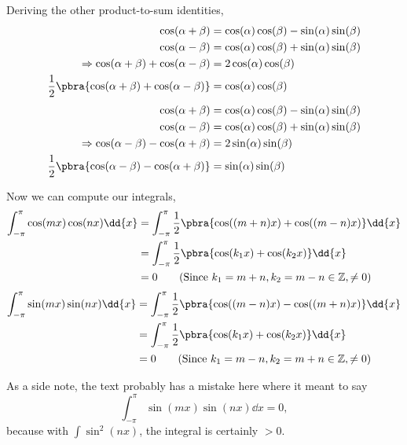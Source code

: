 {{Deriving the other product-to-sum identities,
\begin{align*}
  \cos(\alpha + \beta) &= \cos(\alpha)\cos(\beta) - \sin(\alpha)\sin(\beta)\\
  \cos(\alpha - \beta) &= \cos(\alpha)\cos(\beta) + \sin(\alpha)\sin(\beta)\\
  \Rightarrow \cos(\alpha + \beta) + 
  \cos(\alpha - \beta) &= 2\cos(\alpha)\cos(\beta)\\
  \frac{1}{2}\pbra{
    \cos(\alpha + \beta) + 
    \cos(\alpha - \beta) 
  }
  &= \cos(\alpha)\cos(\beta)
\end{align*}
\begin{align*}
  \cos(\alpha + \beta) &= \cos(\alpha)\cos(\beta) - \sin(\alpha)\sin(\beta)\\
  \cos(\alpha - \beta) &= \cos(\alpha)\cos(\beta) + \sin(\alpha)\sin(\beta)\\
  \Rightarrow \cos(\alpha - \beta) -
  \cos(\alpha + \beta) &= 2\sin(\alpha)\sin(\beta)\\
  \frac{1}{2}\pbra{
    \cos(\alpha - \beta) - 
    \cos(\alpha + \beta) 
  }
  &= \sin(\alpha)\sin(\beta)
\end{align*}

Now we can compute our integrals,
\begin{align*}
  \int_{-\pi}^\pi \cos(mx)\cos(nx)\dd{x} 
  &=
  \int_{-\pi}^\pi \frac{1}{2}\pbra{
    \cos((m+n)x)  + \cos((m-n)x)
  } \dd{x}\\
  &=
  \int_{-\pi}^\pi \frac{1}{2}\pbra{
    \cos(k_1x)  + \cos(k_2x)
  } \dd{x}\\
  &= 0 
  \tag{Since $k_1=m+n, k_2=m-n \in \mathbb{Z}, \neq 0$}
\end{align*}
\begin{align*}
  \int_{-\pi}^\pi \sin(mx)\sin(nx)\dd{x} 
  &=
  \int_{-\pi}^\pi \frac{1}{2}\pbra{
    \cos((m-n)x)  - \cos((m+n)x)
  } \dd{x}\\
  &=
  \int_{-\pi}^\pi \frac{1}{2}\pbra{
    \cos(k_1x)  + \cos(k_2x)
  } \dd{x}\\
  &= 0 
  \tag{Since $k_1=m-n, k_2=m+n \in \mathbb{Z}, \neq 0$}
\end{align*}

As a side note, the text probably has a mistake here where it meant to say 
\begin{equation*}
  \int_{-\pi}^\pi \sin(mx)\sin(nx) \dd{x} = 0,
\end{equation*}
because with $\int \sin^2(nx)$, the integral is certainly $> 0$.
}
}

